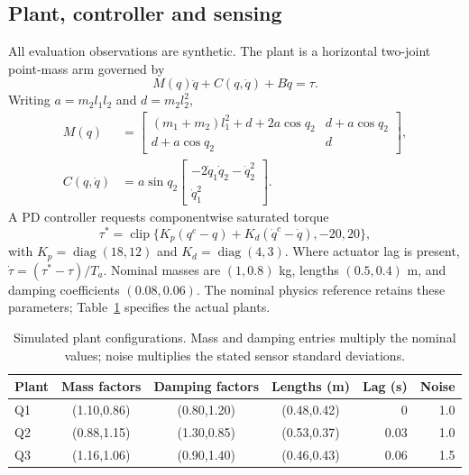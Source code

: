 \documentclass[11pt]{article}
\begin{document}
\subsection{Plant, controller and sensing}
All evaluation observations are synthetic. The plant is a horizontal two-joint point-mass arm governed by
\begin{equation}
 M(q)\ddot q+C(q,\dot q)+B\dot q=\tau.
\end{equation}
Writing $a=m_2l_1l_2$ and $d=m_2l_2^2$,
\begin{align}
 M(q)&=\begin{bmatrix}(m_1+m_2)l_1^2+d+2a\cos q_2&d+a\cos q_2\\d+a\cos q_2&d\end{bmatrix},\\
 C(q,\dot q)&=a\sin q_2\begin{bmatrix}-2\dot q_1\dot q_2-\dot q_2^2\\\dot q_1^2\end{bmatrix}.
\end{align}
A PD controller requests componentwise saturated torque
\begin{equation}
 \tau^*=\operatorname{clip}\{K_p(q^c-q)+K_d(\dot q^c-\dot q),-20,20\},
\end{equation}
with $K_p=\operatorname{diag}(18,12)$ and $K_d=\operatorname{diag}(4,3)$. Where actuator lag is present, $\dot\tau=(\tau^*-\tau)/T_a$. Nominal masses are $(1,0.8)$ kg, lengths $(0.5,0.4)$ m, and damping coefficients $(0.08,0.06)$. The nominal physics reference retains these parameters; Table~\ref{tab:plants} specifies the actual plants.

\begin{table}[htbp]\centering\small
\caption{Simulated plant configurations. Mass and damping entries multiply the nominal values; noise multiplies the stated sensor standard deviations.}\label{tab:plants}
\setlength{\tabcolsep}{5pt}
\begin{tabular}{lcccrr}\toprule
Plant & Mass factors & Damping factors & Lengths (m) & Lag (s) & Noise\\\midrule
Q1 & (1.10,0.86) & (0.80,1.20) & (0.48,0.42) & 0 & 1.0\\
Q2 & (0.88,1.15) & (1.30,0.85) & (0.53,0.37) & 0.03 & 1.0\\
Q3 & (1.16,1.06) & (0.90,1.40) & (0.46,0.43) & 0.06 & 1.5\\\bottomrule
\end{tabular}
\end{table}
\end{document}
